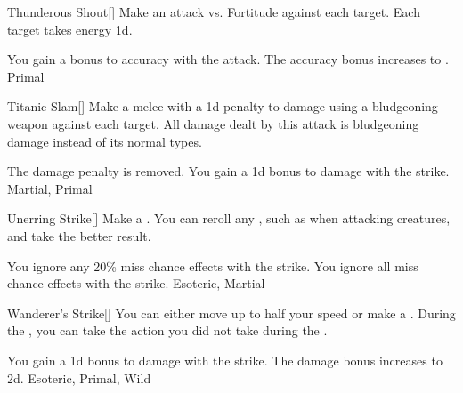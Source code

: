 \lowercase{\hypertarget{maneuver:Thunderous Shout}{}}\label{maneuver:Thunderous Shout}
\hypertarget{maneuver:Thunderous Shout}{}
\begin{freeability}[Rank 3]{Thunderous Shout}[]
Make an attack vs. Fortitude against each target.
\hit Each target takes energy  \minus1d.

\rankline
{} You gain a  bonus to accuracy with the attack.
 The accuracy bonus increases to .
 Primal
\end{freeability}
\vspace{0.25em}



\lowercase{\hypertarget{maneuver:Titanic Slam}{}}\label{maneuver:Titanic Slam}
\hypertarget{maneuver:Titanic Slam}{}
\begin{freeability}[Rank 3]{Titanic Slam}[]
Make a melee  with a \minus1d penalty to damage using a bludgeoning weapon against each target.
All damage dealt by this attack is bludgeoning damage instead of its normal types.

\rankline
{} The damage penalty is removed.
 You gain a \plus1d bonus to damage with the strike.
 Martial, Primal
\end{freeability}
\vspace{0.25em}



\lowercase{\hypertarget{maneuver:Unerring Strike}{}}\label{maneuver:Unerring Strike}
\hypertarget{maneuver:Unerring Strike}{}
\begin{freeability}[Rank 3]{Unerring Strike}[]
Make a .
You can reroll any , such as when attacking  creatures, and take the better result.

\rankline
{} You ignore any 20\% miss chance effects with the strike.
 You ignore all miss chance effects with the strike.
 Esoteric, Martial
\end{freeability}
\vspace{0.25em}



\lowercase{\hypertarget{maneuver:Wanderer's Strike}{}}\label{maneuver:Wanderer's Strike}
\hypertarget{maneuver:Wanderer's Strike}{}
\begin{freeability}[Rank 3]{Wanderer's Strike}[]
You can either move up to half your speed or make a .
During the , you can take the action you did not take during the .

\rankline
{} You gain a \plus1d bonus to damage with the strike.
 The damage bonus increases to \plus2d.
 Esoteric, Primal, Wild
\end{freeability}
\vspace{0.25em}


